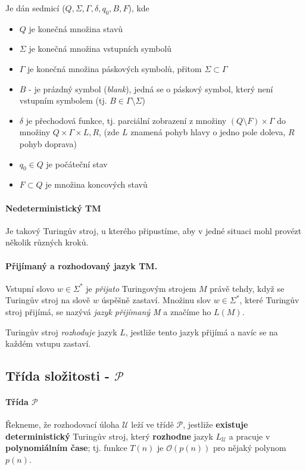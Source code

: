 \noindent Je dán sedmicí ($Q,\Sigma, \Gamma, \delta, 
q_0, B, F$), kde

\begin{itemize}[itemsep=0pt]
    \item $Q$ je konečná množina stavů
    \item $\Sigma$ je konečná množina vstupních symbolů
    \item $\Gamma$ je konečná množina páskových symbolů, přitom $\Sigma \subset \Gamma$
    \item $B$ - je prázdný symbol (\textit{blank}), jedná se o páskový symbol, který není vstupním symbolem (tj. $B \in \Gamma \setminus \Sigma$)
    \item $\delta$ je přechodová funkce, tj. parciální zobrazení z množiny $(Q \setminus F) \times \Gamma$ do množiny $Q \times \Gamma \times {L,R}$, (zde $L$ znamená pohyb hlavy o jedno pole doleva, $R$ pohyb doprava)
    \item $q_0 \in Q$ je počáteční stav
    \item $F \subset Q$ je množina koncových stavů
\end{itemize}

\paragraph{Nedeterministický TM} Je takový Turingův stroj, u kterého připustíme, aby v jedné situaci mohl provézt několik různých kroků.

\paragraph{Přijímaný a rozhodovaný jazyk TM.} Vstupní slovo $w \in \Sigma^*$ je \textit{přijato} Turingovým strojem $M$ právě tehdy, když se Turingův stroj na slově $w$ úspěšně zastaví. Množinu slov $w \in \Sigma^*$, které Turingův stroj přijímá, se nazývá \textit{jazyk přijímaný M} a značíme ho $L(M)$.

Turingův stroj \textit{rozhoduje} jazyk $L$, jestliže tento jazyk přijímá a navíc se na každém vstupu zastaví.

\subsection*{Třída složitosti -  $\mathcal{P}$}
\label{heading:p}

\paragraph{Třída $\mathcal{P}$} Řekneme, že rozhodovací úloha $\mathcal{U}$ leží ve třídě $\mathcal{P}$, jestliže \textbf{existuje deterministický} Turingův stroj, který \textbf{rozhodne} jazyk $L_\mathcal{U}$ a pracuje v \textbf{polynomiálním čase}; tj. funkce $T(n)$ je $\mathcal{O}(p(n))$ pro nějaký polynom $p(n)$.

